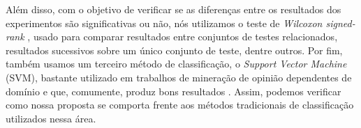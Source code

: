 \documentclass[template.tex]{subfiles}
\begin{document}
Além disso, com o objetivo de verificar se as diferenças entre os resultados dos experimentos são significativas ou não, nós utilizamos o teste de \textit{Wilcoxon signed-rank} \cite{wilcoxon1945individual}, usado para comparar resultados entre conjuntos de testes relacionados, resultados sucessivos sobre um único conjunto de teste, dentre outros. Por fim, também usamos um terceiro método de classificação, o \textit{Support Vector Machine} (SVM), bastante utilizado em trabalhos de mineração de opinião dependentes de domínio e que, comumente, produz bons resultados \cite{ohana2009sentiment, moraes2012document}. Assim, podemos verificar como nossa proposta se comporta frente aos métodos tradicionais de classificação utilizados nessa área. 
\end{document}
